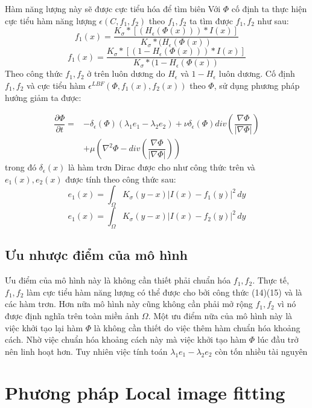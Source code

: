 \documentclass[12pt,oneside,a4]{report}
\begin{document}
Hàm năng lượng này sẽ được cực tiểu hóa để tìm biên 
Với $\Phi$ cố định ta thực hiện cực tiểu hàm năng lượng $\epsilon(C, f_1, f_2)$  theo $f_1, f_2$ ta tìm được $f_1, f_2$ như sau:
\begin{equation}
f_1(x)=\dfrac{K_{\sigma}*[(H_{\epsilon}(\Phi(x)))*I(x)]}{K_{\sigma}*(H_{\epsilon}(\Phi(x))}
\end{equation}
\begin{equation}
f_1(x)=\dfrac{K_{\sigma}*[(1-H_{\epsilon}(\Phi(x)))*I(x)]}{K_{\sigma}*(1-H_{\epsilon}(\Phi(x))}
\end{equation}
Theo công thức $f_1, f_2$ ở trên luôn dương do $H_{\epsilon}$ và $1-H_{\epsilon}$ luôn dương. Cố định $f_1, f_2$ và cực tiểu hàm $\epsilon^{LBF}(\Phi, f_1(x), f_2(x))$ theo $\Phi$, sử dụng phương pháp hướng giảm ta được:

\begin{equation}
\begin{split}
\dfrac{\partial \Phi}{\partial t}=&- \delta_{\epsilon}(\Phi)(\lambda_1 e_1 -\lambda_2 e_2)+\nu \delta_{\epsilon}(\Phi)div(\dfrac{\nabla \Phi}{|\nabla \Phi|})\\
&+\mu(\nabla^2 \Phi -div(\dfrac{\nabla \Phi}{|\nabla \Phi|}))
\end{split}
\end{equation} 
trong đó $\delta_{\epsilon}(x)$ là hàm trơn Dirac được cho như công thức trên và $e_1(x), e_2(x)$ được tính theo công thức sau:
\begin{equation}
e_1(x)=\int_{\Omega}K_{\sigma}(y-x)|I(x)-f_1(y)|^2 \,dy
\end{equation}
\begin{equation}
e_1(x)=\int_{\Omega}K_{\sigma}(y-x)|I(x)-f_2(y)|^2 \,dy
\end{equation}
\subsection{Ưu nhược điểm của mô hình}
Ưu điểm của mô hình này là không cần thiết phải chuẩn hóa $f_1, f_2$. Thực tế, $f_1, f_2$ làm cực tiểu hàm năng lượng có thể được cho bởi công thức (14)(15) và là các hàm trơn. Hơn nữa mô hình này cũng không cần phải mở rộng $f_1, f_2$ vì nó được định nghĩa trên toàn miền ảnh $\Omega$. Một ưu điểm nữa của mô hình này là việc khởi tạo lại hàm $\Phi$ là không cần thiết do việc thêm hàm chuẩn hóa khoảng cách. Nhờ việc chuẩn hóa khoảng cách này mà việc khởi tạo hàm $\Phi$ lúc đầu trở nên linh hoạt hơn.
Tuy nhiên việc tính toán $\lambda_1 e_1 -\lambda_2 e_2$ còn tốn nhiều tài nguyên
\section{Phương pháp Local image fitting}
\end{document}
